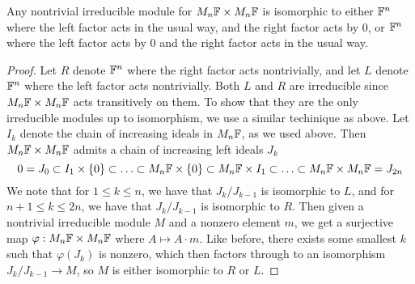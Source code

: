 %
\begin{thm}
Any nontrivial irreducible module for $M_n\mathbb{F} \times M_n\mathbb{F}$ is isomorphic to
either $\mathbb{F}^n$ where the left factor acts in the usual way, and the right factor
acts by $0$, or $\mathbb{F}^n$ where the left factor acts by $0$ and the right factor
acts in the usual way.
\end{thm}
%
\begin{proof}
Let $R$ denote $\mathbb{F}^n$ where the right factor acts nontrivially, and let $L$
denote $\mathbb{F}^n$ where the left factor acts nontrivially. Both $L$ and $R$ are
irreducible since $M_n\mathbb{F} \times M_n\mathbb{F}$ acts transitively on them. To show
that they are the only irreducible modules up to isomorphism, we use a similar
techinique as above. Let $I_k$ denote the chain of increasing ideals in $M_n\mathbb{F}$,
as we used above. Then $M_n\mathbb{F} \times M_n\mathbb{F}$ admits a chain of increasing left
ideals $J_k$
\[
0 = J_0 \subset I_1 \times \left\lbrace 0 \right\rbrace \subset \ldots \subset M_n\mathbb{F} \times \left\lbrace 0 \right\rbrace
\subset M_n\mathbb{F} \times I_1 \subset \ldots \subset M_n\mathbb{F} \times M_n\mathbb{F} = J_{2n}
\]
We note that for $1 \leq k \leq n$, we have that $J_k / J_{k-1}$ is isomorphic to
$L$, and for $n+1 \leq k \leq 2n$, we have that $J_k / J_{k-1}$ is isomorphic to
$R$. Then given a nontrivial irreducible module $M$ and a nonzero element $m$,
we get a surjective map $\varphi : M_n\mathbb{F} \times M_n\mathbb{F}$ where $A \mapsto A\cdot m$.
Like before, there exists some smallest $k$ such that $\varphi(J_k)$ is nonzero,
which then factors through to an isomorphism $J_k / J_{k-1} \to M$, so $M$
is either isomorphic to $R$ or $L$.
\end{proof}
%
